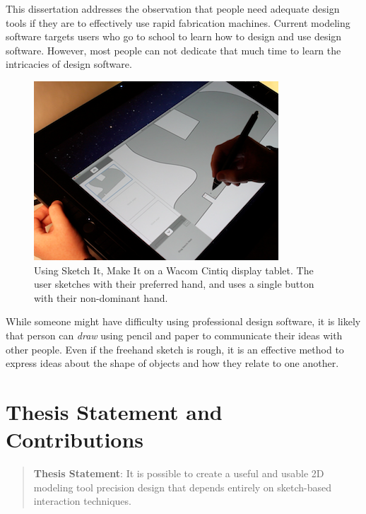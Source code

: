 This dissertation addresses the observation that people need adequate
design tools if they are to effectively use rapid fabrication
machines. Current modeling software targets users who go to school to
learn how to design and use design software. However, most people can
not dedicate that much time to learn the intricacies of design
software.

\begin{figure}[t]
  \centering
  \includegraphics[width=0.9\linewidth]{img/simi-with-cintiq.png}
  \caption[SIMI on a Wacom Cintiq]{Using Sketch It, Make It on a Wacom
    Cintiq display tablet. The user sketches with their preferred
    hand, and uses a single button with their non-dominant hand.}
  \label{fig:simi-intro}
\end{figure}

While someone might have difficulty using professional design
software, it is likely that person can \textit{draw} using pencil and
paper to communicate their ideas with other people. Even if the
freehand sketch is rough, it is an effective method to express ideas
about the shape of objects and how they relate to one another.

\section{Thesis Statement and Contributions} 

\begin{quote}
\textbf{Thesis Statement}: It is possible to create a useful and
usable 2D modeling tool precision design that depends entirely on
sketch-based interaction techniques.
\end{quote}

